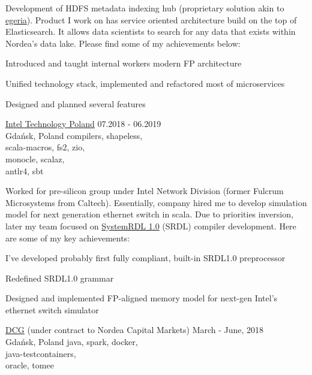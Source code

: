 \documentclass[a4paper,11pt]{cv4tw}%
\begin{document}
      {Development of HDFS metadata indexing hub (proprietary solution akin to \href{https://egeria.odpi.org}{egeria}).
        Product I work on has service oriented architecture build on the top of
        Elasticsearch. It allows data scientists to search for any data that exists
        within Nordea's data lake. Please find some of my achievements below:
        \begin{missions}
        \item Introduced and taught internal workers modern FP architecture
        \item Unified technology stack, implemented and refactored most of microservices
        \item Designed and planned several features
        \end{missions}
      }
      {\href{https://www.intel.com/content/www/us/en/jobs/locations/poland.html}{Intel Technology Poland}}
      {07.2018 - 06.2019\\Gdańsk, Poland}
      {compilers, shapeless,\\scala-macros, fs2, zio,\\monocle, scalaz,\\antlr4, sbt}
      {Worked for pre-silicon group under Intel Network Division (former Fulcrum Microsystems from Caltech).
        Essentially, company hired me to develop simulation model for next generation ethernet switch in scala.
        Due to priorities inversion, later my team focused on
        \href{https://www.accellera.org/downloads/standards/systemrdl}{SystemRDL 1.0} (SRDL) compiler development.
        Here are some of my key achievements:
        \begin{missions}
        \item I've developed probably first fully compliant, built-in SRDL1.0 preprocessor
        \item Redefined SRDL1.0 grammar
        \item Designed and implemented FP-aligned memory model for next-gen Intel's ethernet switch simulator
        \end{missions}
      }
      {\href{https://diversecg.pl/}{DCG} (under contract to Nordea Capital Markets)}
      {March - June, 2018\\Gdańsk, Poland}
      {java, spark, docker,\\java-testcontainers,\\oracle, tomee}
\end{document}
